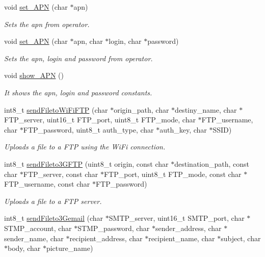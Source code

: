 \begin{DoxyCompactItemize}
void \hyperlink{class_wasp3_g_af9409dba023dfcefc0f54664a161c1e9}{set\+\_\+\+A\+PN} (char $\ast$apn)
\begin{DoxyCompactList}\small\item\em Sets the apn from operator. \end{DoxyCompactList}\item 
void \hyperlink{class_wasp3_g_a0adfe7237426b6915824eac4c00b6a10}{set\+\_\+\+A\+PN} (char $\ast$apn, char $\ast$login, char $\ast$password)
\begin{DoxyCompactList}\small\item\em Sets the apn, login and password from operator. \end{DoxyCompactList}\item 
void \hyperlink{class_wasp3_g_a885f24796fe4ecfe2607a39bcb08fdfe}{show\+\_\+\+A\+PN} ()
\begin{DoxyCompactList}\small\item\em It shows the apn, login and password constants. \end{DoxyCompactList}\item 
int8\+\_\+t \hyperlink{class_wasp3_g_a69588ea512d376de16a04941d5849b3e}{send\+Fileto\+Wi\+Fi\+F\+TP} (char $\ast$origin\+\_\+path, char $\ast$destiny\+\_\+name, char $\ast$F\+T\+P\+\_\+server, uint16\+\_\+t F\+T\+P\+\_\+port, uint8\+\_\+t F\+T\+P\+\_\+mode, char $\ast$F\+T\+P\+\_\+username, char $\ast$F\+T\+P\+\_\+password, uint8\+\_\+t auth\+\_\+type, char $\ast$auth\+\_\+key, char $\ast$S\+S\+ID)
\begin{DoxyCompactList}\small\item\em Uploads a file to a F\+TP using the Wi\+Fi connection. \end{DoxyCompactList}\item 
int8\+\_\+t \hyperlink{class_wasp3_g_a34d63efc4350f5af07e0472ea5548e30}{send\+Fileto3\+G\+F\+TP} (uint8\+\_\+t origin, const char $\ast$destination\+\_\+path, const char $\ast$F\+T\+P\+\_\+server, const char $\ast$F\+T\+P\+\_\+port, uint8\+\_\+t F\+T\+P\+\_\+mode, const char $\ast$F\+T\+P\+\_\+username, const char $\ast$F\+T\+P\+\_\+password)
\begin{DoxyCompactList}\small\item\em Uploads a file to a F\+TP server. \end{DoxyCompactList}\item 
int8\+\_\+t \hyperlink{class_wasp3_g_ae10cefe882af8eacf7816429e2936db1}{send\+Fileto3\+Gemail} (char $\ast$S\+M\+T\+P\+\_\+server, uint16\+\_\+t S\+M\+T\+P\+\_\+port, char $\ast$S\+T\+M\+P\+\_\+account, char $\ast$S\+T\+M\+P\+\_\+password, char $\ast$sender\+\_\+address, char $\ast$sender\+\_\+name, char $\ast$recipient\+\_\+address, char $\ast$recipient\+\_\+name, char $\ast$subject, char $\ast$body, char $\ast$picture\+\_\+name)

\end{DoxyCompactItemize}

